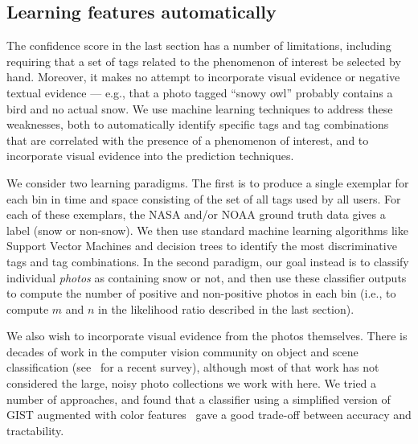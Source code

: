 \subsection{Learning features automatically}

The confidence score in the last section has a number of limitations,
including requiring that a set of tags related to the phenomenon of
interest be selected by hand. Moreover, it makes no attempt to
incorporate visual evidence or negative textual evidence --- e.g.,
that a photo tagged ``snowy owl'' probably contains a bird and no
actual snow.  We use machine learning techniques to address these
weaknesses, both to automatically identify specific tags and tag
combinations that are correlated with the presence of a phenomenon of
interest, and to incorporate visual evidence into the prediction techniques.

  We consider two learning paradigms. The first
is to produce a single exemplar for each bin in time and space
consisting of the set of all tags used by all users. For each of these
exemplars, the NASA and/or NOAA ground truth data gives a label (snow
or non-snow). We then use standard machine learning algorithms like
Support Vector Machines and decision trees to identify the most
discriminative tags and tag combinations. In the second paradigm, our
goal instead is to classify individual \textit{photos} as containing
snow or not, and then use these classifier outputs to compute the
number of positive and non-positive photos in each bin (i.e., to
compute $m$ and $n$ in the likelihood ratio described in the last
section).

  We also wish to incorporate visual
evidence from the photos themselves. There is decades of
work in the computer vision community on object and scene
classification (see~\cite{szeliski} for a recent survey), although
most of that work has not considered the large, noisy photo collections we work with here. We tried a number of
approaches, and found that a classifier using a simplified version of
GIST  augmented with color features~\cite{gist, hays}
gave a good trade-off between accuracy and 
tractability.

